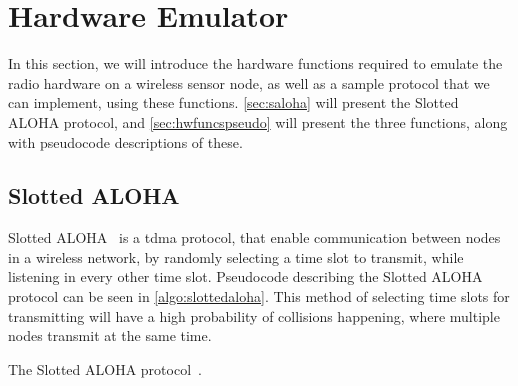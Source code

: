 \section{Hardware Emulator}\label{sec:mpiprotocol}
In this section, we will introduce the hardware functions required to emulate the radio hardware on a wireless sensor node, as well as a sample protocol that we can implement, using these functions. \autoref{sec:saloha} will present the Slotted ALOHA protocol, and \autoref{sec:hwfuncspseudo} will present the three functions, along with pseudocode descriptions of these.

\subsection{Slotted ALOHA}\label{sec:saloha}
Slotted ALOHA~\cite{Roberts:1975:APS:1024916.1024920} is a \gls{tdma} protocol, that enable communication between nodes in a wireless network, by randomly selecting a time slot to transmit, while listening in every other time slot. Pseudocode describing the Slotted ALOHA protocol can be seen in \autoref{algo:slottedaloha}. This method of selecting time slots for transmitting will have a high probability of collisions happening, where multiple nodes transmit at the same time.\medbreak


\begin{algorithm}[ht]
    \DontPrintSemicolon


    \caption{The Slotted ALOHA protocol~\cite{Roberts:1975:APS:1024916.1024920}.}
    \label{algo:slottedaloha}
\end{algorithm}

